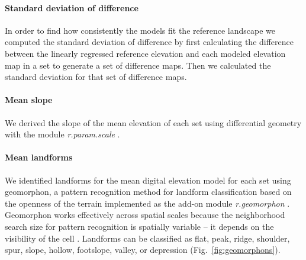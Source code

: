\documentclass[prodmode,acmtochi]{acmsmall} %
\begin{document}
\paragraph{Standard deviation of difference}
In order to find 
how consistently the models fit the reference landscape
we computed the standard deviation of difference
by first calculating the difference 
between the linearly regressed reference elevation and 
each modeled elevation map in a set
to generate a set of difference maps.
Then we calculated the standard deviation 
for that set of difference maps.  

%
%
%
%
%
%
%

\paragraph{Mean slope}
We derived the slope of the mean elevation of each set %
using differential geometry
\cite{Wood1996} 
with the module \textit{r.param.scale} \cite{r.param.scale}.

\paragraph{Mean landforms}
We identified landforms 
for the mean digital elevation model for each set 
using geomorphon,
a pattern recognition method for landform classification 
based on the openness of the terrain
implemented as the add-on module \textit{r.geomorphon} \cite{r.geomorphon}.
Geomorphon works effectively across spatial scales because 
the neighborhood search size for pattern recognition 
is spatially variable -- it depends on the visibility of the cell \cite{Jasiewicz2013}.  
Landforms can be classified as flat, peak, ridge, shoulder, spur, slope, hollow, footslope, valley, or depression (Fig.~\ref{fig:geomorphons}).
\end{document}
